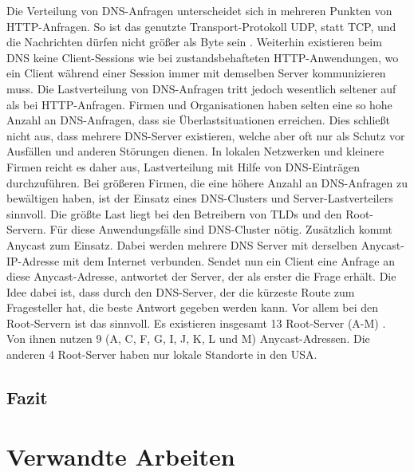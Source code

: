 \documentclass[a4paper, 12pt, BCOR10mm, DIV12, toc=bibliography, toc=listof, german]{scrbook}
\begin{document}
			Die Verteilung von DNS-Anfragen unterscheidet sich in mehreren Punkten von HTTP-Anfragen. So
			ist das genutzte Transport-Protokoll UDP, statt TCP, und die Nachrichten dürfen nicht größer als
			\unit[512]{Byte} sein \cite{rfc1035}. Weiterhin existieren beim DNS keine Client-Sessions wie bei
			zustandsbehafteten HTTP-Anwendungen, wo ein Client während einer Session immer mit demselben Server
			kommunizieren muss. Die Lastverteilung von DNS-Anfragen tritt jedoch wesentlich seltener auf
			als bei HTTP-Anfragen. Firmen und Organisationen haben selten eine so hohe Anzahl an
			DNS-Anfragen, dass sie Überlastsituationen erreichen. Dies schließt nicht aus, dass mehrere
			DNS-Server existieren, welche aber oft nur als Schutz vor Ausfällen und anderen Störungen
			dienen.  In lokalen Netzwerken und kleinere Firmen reicht es daher aus, Lastverteilung mit Hilfe
			von DNS-Einträgen durchzuführen. Bei größeren Firmen, die eine höhere Anzahl an DNS-Anfragen
			zu bewältigen haben, ist der Einsatz eines DNS-Clusters und Server-Lastverteilers sinnvoll. Die
			größte Last liegt bei den Betreibern von TLDs und den Root-Servern. Für diese Anwendungsfälle
			sind DNS-Cluster nötig. Zusätzlich kommt Anycast \cite{rfc4786, sapate2005} zum Einsatz. Dabei
			werden mehrere DNS Server mit derselben Anycast-IP-Adresse mit dem Internet verbunden. Sendet
			nun ein Client eine Anfrage an diese Anycast-Adresse, antwortet der Server, der als erster die
			Frage erhält. Die Idee dabei ist, dass durch den DNS-Server, der die kürzeste Route zum
			Fragesteller hat, die beste Antwort gegeben werden kann. Vor allem bei den Root-Servern ist
			das sinnvoll. Es existieren insgesamt 13 Root-Server
			(A-M) \cite{rootserver}. Von ihnen nutzen 9 (A, C, F, G, I, J, K, L und M)
			Anycast-Adressen. Die anderen 4 Root-Server haben nur lokale Standorte in den USA.
				


		\section{Fazit} %
		\label{sec:grundlagen-fazit}
		



	\chapter{Verwandte Arbeiten} %
	\label{cha:arbeiten}
\end{document}
